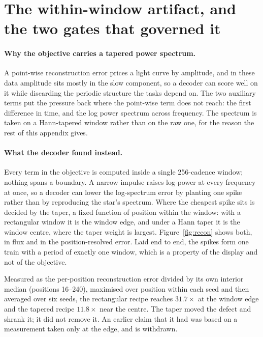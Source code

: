 \documentclass{article}
\begin{document}
\section{The within-window artifact, and the two gates that governed it}
\label{app:artifact}

\paragraph{Why the objective carries a tapered power spectrum.} A point-wise reconstruction error
prices a light curve by amplitude, and in these data amplitude sits mostly in the slow component, so
a decoder can score well on it while discarding the periodic structure the tasks depend on. The two
auxiliary terms put the pressure back where the point-wise term does not reach: the first difference
in time, and the log power spectrum across frequency. The spectrum is taken on a Hann-tapered window
rather than on the raw one, for the reason the rest of this appendix gives.

\paragraph{What the decoder found instead.} Every term in the objective is computed inside a single
256-cadence window; nothing spans a boundary. A narrow impulse raises log-power at every frequency at
once, so a decoder can lower the log-spectrum error by planting one spike rather than by reproducing
the star's spectrum. Where the cheapest spike sits is decided by the taper, a fixed function of
position within the window: with a rectangular window it is the window edge, and under a Hann taper
it is the window centre, where the taper weight is largest. Figure~\ref{fig:recon} shows both, in
flux and in the position-resolved error. Laid end to end, the spikes form one train with a period of
exactly one window, which is a property of the display and not of the objective.

Measured as the per-position reconstruction error divided by its own interior median (positions
16--240), maximised over position within each seed and then averaged over six seeds, the rectangular
recipe reaches $31.7\times$ at the window edge and the tapered recipe $11.8\times$ near the centre.
The taper moved the defect and shrank it; it did not remove it. An earlier claim that it had was
based on a measurement taken only at the edge, and is withdrawn.
\end{document}
